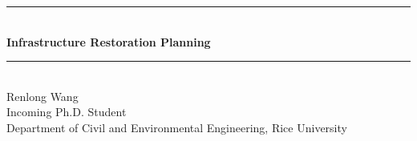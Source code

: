 \documentclass[10pt,a4paper]{book}
\numberwithin{figure}{chapter}
\numberwithin{table}{chapter}
\newcommand{\HRule}[1]{\rule{\linewidth}{#1}}
\begin{document}
\begin{titlepage}
    \centering

    \HRule{1.5pt} \\ [1em]
    {\huge\bfseries{Infrastructure Restoration Planning}} \\ 
    \HRule{1.5pt} \\

    \vfill
    \vspace*{0.5cm}
    {\Large Renlong Wang} \\  [0.25em]

    Incoming Ph.D. Student \\
    Department of Civil and Environmental Engineering, Rice University
\end{titlepage}


\setcounter{page}{0}
\thispagestyle{empty}

\tableofcontents
\newpage


\end{document}
